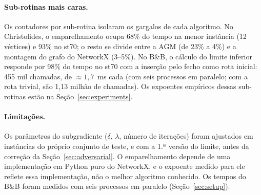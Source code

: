\paragraph{Sub-rotinas mais caras.} Os contadores por sub-rotina isolaram os gargalos
de cada algoritmo. No Christofides, o emparelhamento ocupa 68\% do tempo na menor
instância (12 vértices) e 93\% no st70; o resto se divide entre a AGM (de 23\% a 4\%) e a
montagem do grafo do NetworkX (3--5\%). No B\&B, o cálculo do limite inferior responde
por 98\% do tempo no st70 com a inserção pelo fecho como rota inicial: 455 mil
chamadas, de $\approx 1{,}7$~ms cada (com seis processos em paralelo; com a rota
trivial, são 1,13 milhão de chamadas). Os expoentes
empíricos dessas sub-rotinas estão na Seção~\ref{sec:experiments}.

\paragraph{Limitações.} Os parâmetros do subgradiente ($\delta$, $\lambda$, número de
iterações) foram ajustados em instâncias do próprio conjunto de teste, e com a 1.ª versão
do limite, antes da correção da Seção~\ref{sec:adversarial}. O emparelhamento
depende de uma implementação em Python puro do NetworkX, e o expoente medido para ele
reflete essa implementação, não o melhor algoritmo conhecido. Os tempos do B\&B foram
medidos com seis processos em paralelo (Seção~\ref{sec:setup}).
